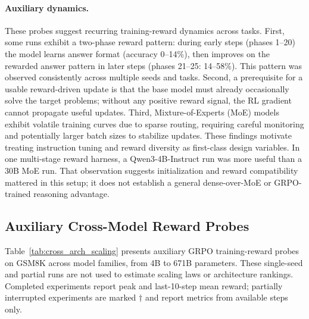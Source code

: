 \documentclass{article}
\begin{document}
\paragraph{Auxiliary dynamics.}
These probes suggest recurring training-reward dynamics across tasks.
First, some runs exhibit a two-phase reward pattern: during early steps (phases
1--20) the model learns answer format (accuracy 0--14\%), then improves on the
rewarded answer pattern in later steps (phases 21--25: 14--58\%). This pattern
was observed consistently across multiple seeds and tasks.
Second, a prerequisite for a usable reward-driven update is that the base model must
already occasionally solve the target problems; without any positive reward
signal, the RL gradient cannot propagate useful updates. Third, Mixture-of-Experts
(MoE) models exhibit volatile training curves due to sparse routing, requiring
careful monitoring and potentially larger batch sizes to stabilize updates.
These findings motivate treating instruction tuning and reward diversity as
first-class design variables. In one multi-stage reward harness, a
Qwen3-4B-Instruct run was more useful than a 30B MoE run. That observation
suggests initialization and reward compatibility mattered in this setup; it
does not establish a general dense-over-MoE or GRPO-trained reasoning
advantage.

\subsection{Auxiliary Cross-Model Reward Probes}
\label{sec:cross_arch_scaling}

Table~\ref{tab:cross_arch_scaling} presents auxiliary GRPO training-reward
probes on GSM8K across model families, from 4B to 671B parameters.  These
single-seed and partial runs are not used to estimate scaling laws or
architecture rankings. Completed experiments report peak and last-10-step
mean reward; partially interrupted experiments are marked $\dagger$ and report
metrics from available steps only.
\end{document}
